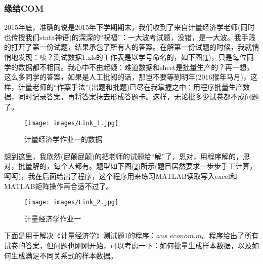         \subsubsection{缘结COM}
            \par
            2015年底，准确的说是2015年下学期期末，我们收到了来自计量经济学老师(同时也传授我们stata神语)的深深的“祝福”：一大波考试题，没错，是一大波。我手贱的打开了第一份试题，结果承包了所有人的答案。在解第一份试题的时候，我就悄悄地发现：咦？测试数据1.xls的工作表是以学号命名的，如下图(\ref{fig:Link_1})，只是每位同学的数据都不相同。我心中不由起疑：难道数据和sheet是批量生产的？再一想，这么多同学的答案，如果是人工批阅的话，那岂不要等到明年(2016猴年马月)，这样，计量老师的“作案手法”(出题和批题)已尽在我掌握之中：用程序批量生产数据，同时记录答案，再将答案抹去形成答题卡。这样，无论批多少试卷都不成问题了。
            \begin{figure}[H]
            \centering
            \texttt{[image: images/Link\_1.jpg]}
            \caption{计量经济学作业一的数据}
            \label{fig:Link_1}
            \end{figure}
            \par
            想到这里，我欣然(屁颠屁颠)的把老师的试题给“解”了，恩对，用程序解的，恩对，批量解的，每个人都有。题型如下图(\ref{fig:Link_2})所示(题目居然要求一步步手工计算，呵呵)，我在后面给出了程序，这个程序用来练习MATLAB读取写入excel和MATLAB矩阵操作再合适不过了。
            \begin{figure}[H]
            \centering
            \texttt{[image: images/Link\_2.jpg]}
            \caption{计量经济学作业一}
            \label{fig:Link_2}
            \end{figure}
            \par
            下面是用于解决《计量经济学》测试题1的程序：$ans\_econom.m$。程序给出了所有试卷的答案，但问题也刚刚开始，可以考虑一下：如何批量生成样本数据，以及如何生成满足不同关系式的样本数据。
